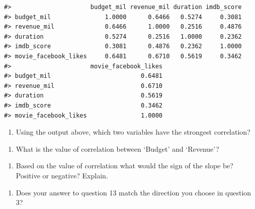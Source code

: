 \documentclass[
]{report}
\providecommand{\tightlist}{%
  \setlength{\itemsep}{0pt}\setlength{\parskip}{0pt}}
\begin{document}
\begin{verbatim}
#>                      budget_mil revenue_mil duration imdb_score
#> budget_mil               1.0000      0.6466   0.5274     0.3081
#> revenue_mil              0.6466      1.0000   0.2516     0.4876
#> duration                 0.5274      0.2516   1.0000     0.2362
#> imdb_score               0.3081      0.4876   0.2362     1.0000
#> movie_facebook_likes     0.6481      0.6710   0.5619     0.3462
#>                      movie_facebook_likes
#> budget_mil                         0.6481
#> revenue_mil                        0.6710
#> duration                           0.5619
#> imdb_score                         0.3462
#> movie_facebook_likes               1.0000
\end{verbatim}

\begin{enumerate}
\def\labelenumi{\arabic{enumi}.}
\setcounter{enumi}{4}
\tightlist
\item
  Using the output above, which two variables have the strongest correlation?
\end{enumerate}

\vspace{0.5in}

\begin{enumerate}
\def\labelenumi{\arabic{enumi}.}
\setcounter{enumi}{5}
\tightlist
\item
  What is the value of correlation between `Budget' and `Revenue'?
\end{enumerate}

\vspace{0.5in}

\begin{enumerate}
\def\labelenumi{\arabic{enumi}.}
\setcounter{enumi}{6}
\tightlist
\item
  Based on the value of correlation what would the sign of the slope be? Positive or negative? Explain.
\end{enumerate}

\vspace{1in}

\begin{enumerate}
\def\labelenumi{\arabic{enumi}.}
\setcounter{enumi}{7}
\tightlist
\item
  Does your answer to question 13 match the direction you choose in question 3?
\end{enumerate}

\vspace{0.5in}
\end{document}
